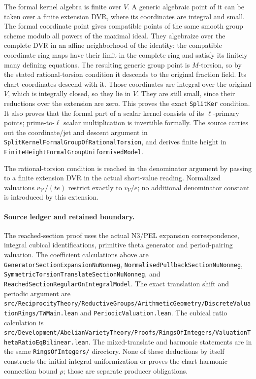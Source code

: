 The formal kernel algebra is finite over \(V\).
A generic algebraic point of it can be taken over a finite extension
DVR, where its coordinates are integral and small.
The formal coordinate point gives compatible points of the same
smooth group scheme modulo all powers of the maximal ideal.
They algebraize over the complete DVR in an affine neighborhood of
the identity: the compatible coordinate ring maps have their limit
in the complete ring and satisfy its finitely many defining equations.
The resulting generic group point is \(M\)-torsion, so by the stated
rational-torsion condition it descends to the original fraction field.
Its chart coordinates descend with it.
Those coordinates are integral over the original \(V\), which is
integrally closed, so they lie in \(V\).
They are still small, since their reductions over the extension are
zero.  This proves the exact \texttt{SplitKer} condition.
It also proves that the formal part of a scalar kernel consists of
its \(\ell\)-primary points; prime-to-\(\ell\) scalar multiplication
is invertible formally.
The source carries out the coordinate/jet and descent argument in
\texttt{SplitKernelFormalGroupOfRationalTorsion}, and derives finite
height in \texttt{FiniteHeightFormalGroupUniformisedModel}.

The rational-torsion condition is reached in the denominator argument
by passing to a finite extension DVR in the actual short-value
reading.  Normalized valuations \(v_{V'}/(te)\) restrict exactly to
\(v_V/e\); no additional denominator constant is introduced by this
extension.

\paragraph{Source ledger and retained boundary.}
The reached-section proof uses the actual N3/PEL expansion
correspondence, integral cubical identifications, primitive theta
generator and period-pairing valuation.
The coefficient calculations above are
\texttt{GeneratorSectionExpansionNuNonneg},
\texttt{NormalisedPullbackSectionNuNonneg},
\texttt{SymmetricTorsionTranslateSectionNuNonneg}, and
\texttt{ReachedSectionRegularOnIntegralModel}.
The exact translation shift and periodic argument are
\texttt{src/ReciprocityTheory/ReductiveGroups/ArithmeticGeometry/DiscreteValuationRings/TWMain.lean}
and \texttt{PeriodicValuation.lean}.
The cubical ratio calculation is
\texttt{src/Development/AbelianVarietyTheory/Proofs/RingsOfIntegers/ValuationThetaRatioEqBilinear.lean}.
The mixed-translate and harmonic statements are in the same
\texttt{RingsOfIntegers/} directory.
None of these deductions by itself constructs the initial integral
uniformization or proves the chart harmonic connection bound
\(\rho\); those are separate producer obligations.
